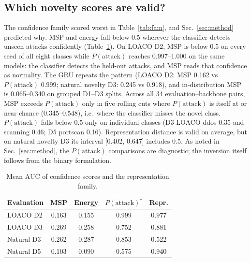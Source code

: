 \documentclass[conference]{IEEEtran}
\begin{document}
\subsection{Which novelty scores are valid?}
\label{sec:c4}
The confidence family scored worst in Table~\ref{tab:fam}, and Sec.~\ref{sec:method} predicted why. MSP and energy fall below 0.5 wherever the classifier detects unseen attacks confidently (Table~\ref{tab:conf}). On LOACO D2, MSP is below 0.5 on every seed of all eight classes while $P(\text{attack})$ reaches 0.997--1.000 on the same models: the classifier detects the held-out attacks, and MSP reads that confidence as normality. The GRU repeats the pattern (LOACO D2: MSP 0.162 vs $P(\text{attack})$ 0.999; natural novelty D3: 0.245 vs 0.918), and in-distribution MSP is 0.065--0.340 on grouped D1--D3 splits. Across all 34 evaluation--backbone pairs, MSP exceeds $P(\text{attack})$ only in five rolling cuts where $P(\text{attack})$ is itself at or near chance (0.345--0.548), i.e.\ where the classifier misses the novel class. $P(\text{attack})$ falls below 0.5 only on individual classes (D3 LOACO ddos 0.35 and scanning 0.46; D5 portscan 0.16). Representation distance is valid on average, but on natural novelty D3 its interval [0.402, 0.647] includes 0.5. As noted in Sec.~\ref{sec:method}, the $P(\text{attack})$ comparisons are diagnostic; the inversion itself follows from the binary formulation.

\begin{table}[!t]
\centering\footnotesize\setlength{\tabcolsep}{4pt}
\caption{Mean AUC of confidence scores and the representation family.}
\label{tab:conf}
\begin{tabular}{lcccc}
\toprule
Evaluation & MSP & Energy & $P(\text{attack})^\dagger$ & Repr.\\
\midrule
LOACO D2 & 0.163 & 0.155 & 0.999 & 0.977\\
LOACO D3 & 0.269 & 0.258 & 0.752 & 0.881\\
Natural D3 & 0.262 & 0.287 & 0.853 & 0.522\\
Natural D5 & 0.103 & 0.090 & 0.575 & 0.940\\
\bottomrule
\end{tabular}
\end{table}
\end{document}
